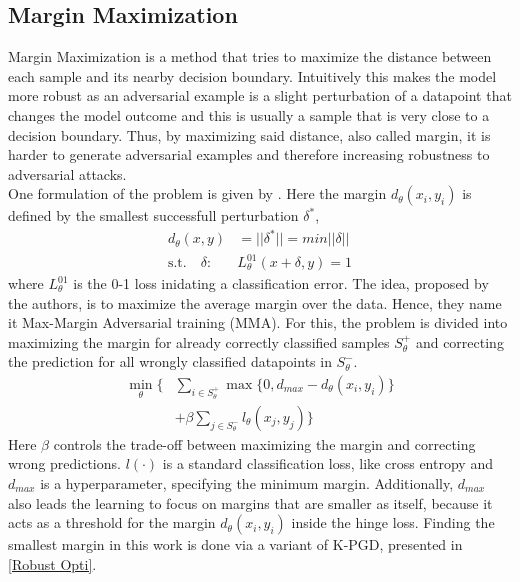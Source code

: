 \documentclass{article}
\begin{document}
\subsection{Margin Maximization}
Margin Maximization is a method that tries to maximize the distance between each sample and its nearby decision boundary. Intuitively this makes the model more robust as an adversarial example is a slight perturbation of a datapoint that changes the model outcome and this is usually a sample that is very close to a decision boundary. Thus, by maximizing said distance, also called margin, it is harder to generate adversarial examples and therefore increasing robustness to adversarial attacks. \\
One formulation of the problem is given by \cite{b1}. Here the margin $d_\theta(x_i, y_i)$ is defined by the smallest successfull perturbation $\delta^*$, 
\begingroup
\setlength\abovedisplayskip{0pt}
\setlength\belowdisplayskip{6pt}
\begin{align*}
  d_\theta(x,y) & = ||\delta^*|| = min ||\delta|| \\ 
  \text{s.t.} \quad \delta: & L_\theta^{01}(x+\delta, y) = 1
\end{align*}
\endgroup
where $L_\theta^{01}$ is the 0-1 loss inidating a classification error. The idea, proposed by the authors, is to maximize the average margin over the data. Hence, they name it Max-Margin Adversarial training (MMA). For this, the problem is divided into maximizing the margin for already correctly classified samples $S_{\theta}^{+}$ and correcting the prediction for all wrongly classified datapoints in $S_{\theta}^{-}$.
\begin{align*}
  \min_{\theta} \Big\{ & \sum_{i \in S_{\theta}^{+}} \max \{0, d_{max} - d_\theta(x_i, y_i)\} \\ 
  & + \beta \sum_{j \in S_{\theta}^{-}} l_\theta (x_j, y_j) \Big\}
\end{align*}
Here $\beta$ controls the trade-off between maximizing the margin and correcting wrong predictions. $l(\cdot)$ is a standard classification loss, like cross entropy and $d_{max}$ is a hyperparameter, specifying the minimum margin. Additionally, $d_{max}$ also leads the learning to focus on margins that are smaller as itself, because it acts as a threshold for the margin $d_\theta(x_i, y_i)$ inside the hinge loss. Finding the smallest margin in this work is done via a variant of K-PGD, presented in \ref{Robust Opti}.
  
\end{document}
